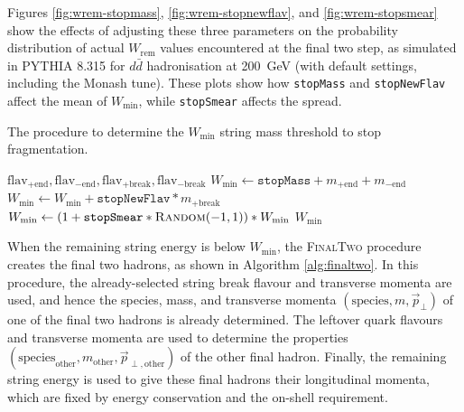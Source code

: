 \documentclass[12pt,a4paper]{report}
\begin{document}
Figures \ref{fig:wrem-stopmass}, \ref{fig:wrem-stopnewflav}, and \ref{fig:wrem-stopsmear} show the effects of adjusting these three parameters on the probability distribution of actual $W_\text{rem}$ values encountered at the final two step, as simulated in PYTHIA 8.315 for $d\bar{d}$ hadronisation at \qty{200}{\giga\electronvolt} (with default settings, including the Monash tune). These plots show how \texttt{stopMass} and \texttt{stopNewFlav} affect the mean of $W_\text{min}$, while \texttt{stopSmear} affects the spread.

\begin{algorithm}
  \caption{The procedure to determine the $W_\text{min}$ string mass threshold to stop fragmentation.}\label{alg:wmin}
  \begin{algorithmic}
     {$\text{flav}_{+\text{end}},\text{flav}_{-\text{end}}, \text{flav}_{+\text{break}},\text{flav}_{-\text{break}}$}
      \State $W_\text{min} \gets \texttt{stopMass} + m_{+\text{end}} + m_{-\text{end}}$
      \State $W_\text{min} \gets W_\text{min} + \texttt{stopNewFlav} * m_{+\text{break}}$
      \State $W_\text{min} \gets (1 + \texttt{stopSmear} *\textsc{Random}(-1, 1) )*W_\text{min} $
      \State \Return $W_\text{min}$
    \EndProcedure
  \end{algorithmic}
\end{algorithm}

When the remaining string energy is below $W_\text{min}$, the \textsc{FinalTwo} procedure creates the final two hadrons, as shown in Algorithm \ref{alg:finaltwo}. In this procedure, the already-selected string break flavour and transverse momenta are used, and hence the species, mass, and transverse momenta $(\text{species}, m, \vec{p}_\perp)$ of one of the final two hadrons is already determined. The leftover quark flavours and transverse momenta are used to determine the properties $(\text{species}_\text{other}, m_\text{other}, \vec{p}_{\perp,\text{other}})$ of the other final hadron. Finally, the remaining string energy is used to give these final hadrons their longitudinal momenta, which are fixed by energy conservation and the on-shell requirement.
\end{document}
